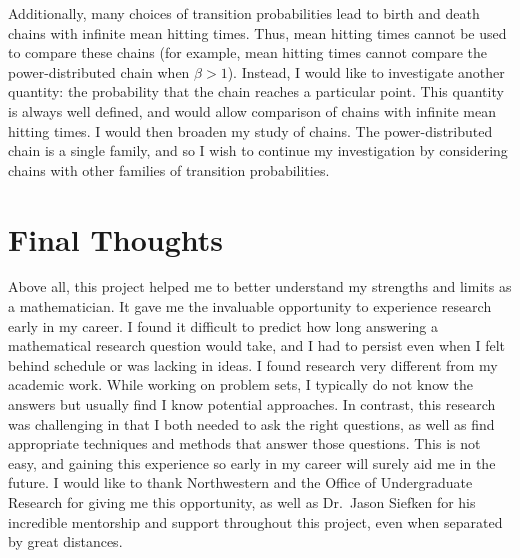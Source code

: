 \documentclass[12pt,letterpaper]{article}
\begin{document}
Additionally, many choices of transition probabilities lead to birth and death chains with infinite mean
hitting times. Thus, mean hitting times cannot be used to compare these chains (for example, mean
hitting times cannot compare the power-distributed chain when $\beta > 1$). Instead, I would like to
investigate another quantity: the probability that the chain reaches a particular point. This quantity
is always well defined, and would allow comparison of chains with infinite mean hitting times. I would
then broaden my study of chains. The power-distributed chain is a single family, and so I wish to
continue my investigation by considering chains with other families of transition probabilities.


\section*{Final Thoughts}
Above all, this project helped me to better understand my strengths and limits as a mathematician. It
gave me the invaluable opportunity to experience research early in my career. I found it difficult to
predict how long answering a mathematical research question would take, and I had to persist even when I
felt behind schedule or was lacking in ideas. I found research very different from my academic work.
While working on problem sets, I typically do not know the answers but usually find I know potential
approaches. In contrast, this research was challenging in that I both needed to ask the right questions,
as well as find appropriate techniques and methods that answer those questions.  This is not easy, and
gaining this experience so early in my career will surely aid me in the future. I would like to thank
Northwestern and the Office of Undergraduate Research for giving me this opportunity, as well as
Dr.~Jason Siefken for his incredible mentorship and support throughout this project, even when separated
by great distances.
\end{document}
